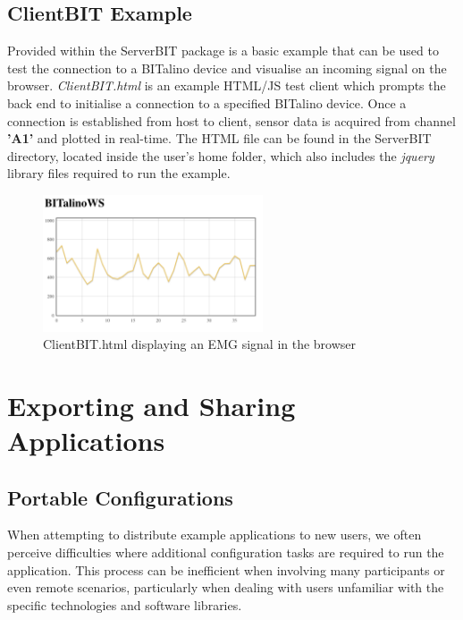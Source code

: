 \subsection{ClientBIT Example}
Provided within the ServerBIT package is a basic example that can be used to test the connection to a BITalino device and visualise an incoming signal on the browser. \textit{ClientBIT.html} is an example HTML/JS
test client which prompts the back end to initialise a connection to a specified BITalino device. Once a connection is established from host to client, sensor data is acquired from channel \textbf{'A1'} and plotted in real-time. The HTML file can be found in the ServerBIT directory, located inside the user's home folder, which also includes the \textit{jquery} library files required to run the example.

\begin{figure}[htb!]
    \centering
    \includegraphics[width=65mm,scale=0.65]{Chapters/Figures/technical/ServerBIT/ClientBIT_html.png}
    \caption{ClientBIT.html displaying an EMG signal in the browser}
    \label{fig:ClientBIT}
\end{figure}

\section{Exporting and Sharing Applications}

\subsection{Portable Configurations}

When attempting to distribute example applications to new users, we often perceive difficulties where additional configuration tasks are required to run the application. This process can be inefficient when involving many participants or even remote scenarios, particularly when dealing with users unfamiliar with the specific technologies and software libraries.

